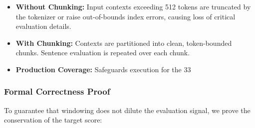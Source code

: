 \documentclass[11pt,a4paper]{article}
\theoremstyle{plain}
\theoremstyle{definition}
\theoremstyle{remark}
\begin{document}
\begin{impbox}
\begin{itemize}[nosep,leftmargin=1.2em]
  \item \textbf{Without Chunking:} Input contexts exceeding 512 tokens are truncated by the tokenizer or raise out-of-bounds index errors, causing loss of critical evaluation details.
  \item \textbf{With Chunking:} Contexts are partitioned into clean, token-bounded chunks. Sentence evaluation is repeated over each chunk.
  \item \textbf{Production Coverage:} Safeguards execution for the 33%
\end{itemize}
\end{impbox}

\subsubsection{Formal Correctness Proof}

To guarantee that windowing does not dilute the evaluation signal, we prove the conservation of the target score:
\end{document}
